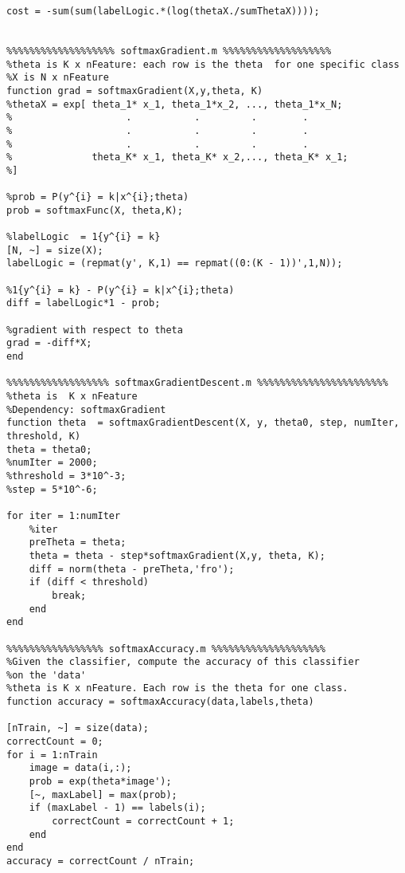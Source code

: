 \documentclass[12pt]{article} %
\theoremstyle{definition}\newtheorem{law}{Law}
\theoremstyle{plain}\newtheorem{jury}[law]{Jury}
\theoremstyle{remark}\newtheorem{juu}{Juu}
\theoremstyle{definition}\newtheorem{kuu}[law]{Kuu}
\theoremstyle{definition}\newtheorem{muu}{Muu}[section]
\theoremstyle{definition}\newtheorem{honoluu}{Honoluu}[section]
\theoremstyle{definition}\newtheorem{konoluu}[muu]{Konoluu}
\begin{document}
\begin{lstlisting}
cost = -sum(sum(labelLogic.*(log(thetaX./sumThetaX))));


%%%%%%%%%%%%%%%%%%% softmaxGradient.m %%%%%%%%%%%%%%%%%%%
%theta is K x nFeature: each row is the theta  for one specific class
%X is N x nFeature 
function grad = softmaxGradient(X,y,theta, K)
%thetaX = exp[ theta_1* x_1, theta_1*x_2, ..., theta_1*x_N;
%                    .           .         .        .
%                    .           .         .        .
%                    .           .         .        .
%              theta_K* x_1, theta_K* x_2,..., theta_K* x_1;
%]

%prob = P(y^{i} = k|x^{i};theta)                  
prob = softmaxFunc(X, theta,K);

%labelLogic  = 1{y^{i} = k}
[N, ~] = size(X);
labelLogic = (repmat(y', K,1) == repmat((0:(K - 1))',1,N));

%1{y^{i} = k} - P(y^{i} = k|x^{i};theta)
diff = labelLogic*1 - prob;

%gradient with respect to theta
grad = -diff*X;
end

%%%%%%%%%%%%%%%%%% softmaxGradientDescent.m %%%%%%%%%%%%%%%%%%%%%%%
%theta is  K x nFeature
%Dependency: softmaxGradient
function theta  = softmaxGradientDescent(X, y, theta0, step, numIter, threshold, K)
theta = theta0;
%numIter = 2000;
%threshold = 3*10^-3;
%step = 5*10^-6;

for iter = 1:numIter
    %iter
    preTheta = theta;
    theta = theta - step*softmaxGradient(X,y, theta, K);
    diff = norm(theta - preTheta,'fro');
    if (diff < threshold)
        break;
    end
end

%%%%%%%%%%%%%%%%% softmaxAccuracy.m %%%%%%%%%%%%%%%%%%%%
%Given the classifier, compute the accuracy of this classifier 
%on the 'data'
%theta is K x nFeature. Each row is the theta for one class.
function accuracy = softmaxAccuracy(data,labels,theta)

[nTrain, ~] = size(data);
correctCount = 0;
for i = 1:nTrain
    image = data(i,:);
    prob = exp(theta*image');
    [~, maxLabel] = max(prob);
    if (maxLabel - 1) == labels(i);
        correctCount = correctCount + 1;
    end
end
accuracy = correctCount / nTrain;
\end{lstlisting}

\end{document}
